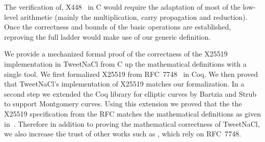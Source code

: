 The verification of, \eg X448~\cite{cryptoeprint:2015:625,rfc7748} in C would
require the adaptation of most of the low-level arithmetic (mainly the
multiplication, carry propagation and reduction).
Once the correctness and bounds of the basic operations are established,
reproving the full ladder would make use of our generic definition.

We provide a mechanized formal proof of the correctness of the X25519
implementation in TweetNaCl from C up the mathematical definitions with a single tool.
We first formalized X25519 from RFC~7748~\cite{rfc7748} in Coq.
We then proved that TweetNaCl's implementation of X25519 matches our formalization.
In a second step we extended the Coq library for elliptic curves \cite{BartziaS14}
by Bartzia and Strub to support Montgomery curves.
Using this extension we proved that the the X25519 specification from the RFC matches the
mathematical definitions as given in~\cite[Sec.~2]{Ber06}.
Therefore in addition to proving the mathematical correctness of TweetNaCl,
we also increase the trust of other works such as
\cite{zinzindohoue2017hacl,Erbsen2016SystematicSO}, which rely on RFC~7748.
\vspace{-0.3cm}
